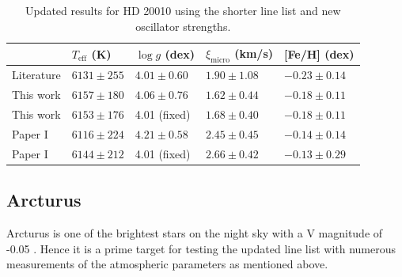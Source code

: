 \documentclass{aa}
\begin{document}
\begin{table}[htb!]
    \caption{Updated results for HD 20010 using the shorter line list and new
             oscillator strengths.}
    \label{tab:hd20010}
    \centering
    \begin{tabular}{lllll}
      \hline\hline
                      & $T_\mathrm{eff}$ (K) &  $\log g$ (dex)  &   $\xi_\mathrm{micro}$ (km/s)   & [Fe/H] (dex)     \\
      \hline
        Literature    & $6131 \pm 255$       &  $4.01 \pm 0.60$ &    $1.90 \pm 1.08$              & $-0.23 \pm 0.14$ \\
      \hline
        This work     & $6157 \pm 180$       &  $4.06 \pm 0.76$ &    $1.62 \pm 0.44$              & $-0.18 \pm 0.11$ \\
        This work     & $6153 \pm 176$       &   4.01 (fixed)   &    $1.68 \pm 0.40$              & $-0.18 \pm 0.11$ \\
      \hline
        Paper I       & $6116 \pm 224$       &  $4.21 \pm 0.58$ &    $2.45 \pm 0.45$              & $-0.14 \pm 0.14$ \\
        Paper I       & $6144 \pm 212$       &   4.01 (fixed)   &    $2.66 \pm 0.42$              & $-0.13 \pm 0.29$ \\
      \hline
    \end{tabular}
\end{table}




\subsection{Arcturus}
\label{sec:arcturus}

Arcturus is one of the brightest stars on the night sky with a V magnitude of
-0.05 \citep{Ducati2002}. Hence it is a prime target for testing the updated
line list with numerous measurements of the atmospheric parameters as mentioned
above.
\end{document}
